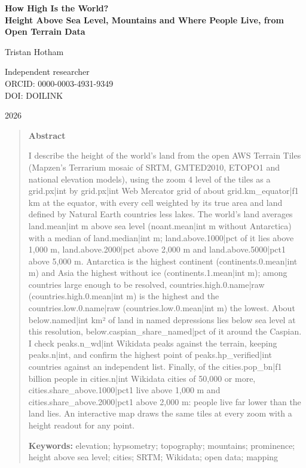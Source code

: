 \documentclass[11pt,a4paper]{article}
\begin{document}
\begin{center}
{\Large\bfseries How High Is the World?\\[2pt] Height Above Sea Level, Mountains and Where People Live, from Open Terrain Data\par}
\vspace{1.2em}
{\large Tristan Hotham\par}
\vspace{0.3em}
{\small Independent researcher\\
ORCID: 0000-0003-4931-9349\\
DOI: {{DOILINK}}\par}
\vspace{0.8em}
2026
\end{center}

\begin{quote}
\small
\begin{center}\textbf{Abstract}\end{center}
I describe the height of the world's land from the open AWS Terrain Tiles (Mapzen's Terrarium mosaic of SRTM, GMTED2010, ETOPO1 and national elevation models), using the zoom 4 level of the tiles as a {{grid.px|int}} by {{grid.px|int}} Web Mercator grid of about {{grid.km_equator|f1}} km at the equator, with every cell weighted by its true area and land defined by Natural Earth countries less lakes. The world's land averages {{land.mean|int}} m above sea level ({{noant.mean|int}} m without Antarctica) with a median of {{land.median|int}} m; {{land.above.1000|pct}} of it lies above 1,000 m, {{land.above.2000|pct}} above 2,000 m and {{land.above.5000|pct1}} above 5,000 m. Antarctica is the highest continent ({{continents.0.mean|int}} m) and Asia the highest without ice ({{continents.1.mean|int}} m); among countries large enough to be resolved, {{countries.high.0.name|raw}} ({{countries.high.0.mean|int}} m) is the highest and the {{countries.low.0.name|raw}} ({{countries.low.0.mean|int}} m) the lowest. About {{below.named|int}} km² of land in named depressions lies below sea level at this resolution, {{below.caspian_share_named|pct}} of it around the Caspian. I check {{peaks.n_wd|int}} Wikidata peaks against the terrain, keeping {{peaks.n|int}}, and confirm the highest point of {{peaks.hp_verified|int}} countries against an independent list. Finally, of the {{cities.pop_bn|f1}} billion people in {{cities.n|int}} Wikidata cities of 50,000 or more, {{cities.share_above.1000|pct1}} live above 1,000 m and {{cities.share_above.2000|pct1}} above 2,000 m: people live far lower than the land lies. An interactive map draws the same tiles at every zoom with a height readout for any point.

\textbf{Keywords:} elevation; hypsometry; topography; mountains; prominence; height above sea level; cities; SRTM; Wikidata; open data; mapping
\end{quote}
\end{document}
